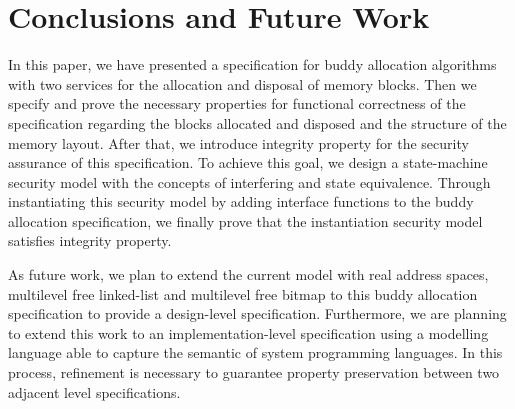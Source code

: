 \section{Conclusions and Future Work}
In this paper, we have presented a specification for buddy allocation algorithms with two services for the allocation and disposal of memory blocks. Then we specify and prove the necessary properties for functional correctness of the specification regarding the blocks allocated and disposed and the structure of the memory layout. After that, we introduce integrity property for the security assurance of this specification. To achieve this goal, we design a state-machine security model with the concepts of interfering and state equivalence. Through instantiating this security model by adding interface functions to the buddy allocation specification, we finally prove that the instantiation security model satisfies integrity property.

As future work, we plan to extend the current model with real address spaces, multilevel free linked-list and multilevel free bitmap to this buddy allocation specification to provide a design-level specification. Furthermore, we are planning to extend this work to an implementation-level specification using a modelling language able to capture the semantic of system programming languages. In this process, refinement is necessary to guarantee property preservation between two adjacent level specifications.
